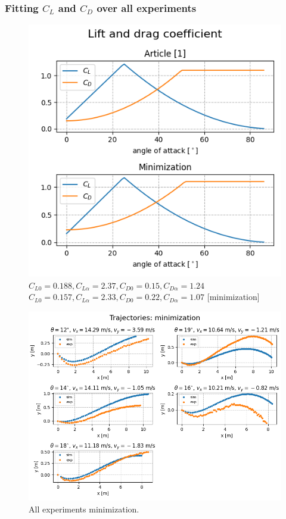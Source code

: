 \documentclass{beamer}
\begin{document}

\begin{frame}

\frametitle{Fitting $C_L$ and $C_D$ over all experiments}

\begin{figure}[H]
	\centering
	  \includegraphics[width=0.6 \textwidth]{mini_clanek_cji.png}
	  \captionsetup{justification=centering,margin=0cm}
	  \caption{$C_{L0} = 0.188, C_{L \alpha}= 2.37, C_{D0} = 0.15, C_{D \alpha} = 1.24$ \cite{clanek} \\
	  $C_{L0} = 0.157, C_{L \alpha}= 2.33, C_{D0} = 0.22, C_{D \alpha} = 1.07$ [minimization]}
\end{figure}

\end{frame}

\begin{frame}


\begin{figure}[H]
	\centering
	  \includegraphics[width= \textwidth]{trajectories_mini.png}
	  \captionsetup{justification=centering,margin=0cm}
	  \caption{All experiments minimization.}
\end{figure}

\end{frame}
\end{document}
